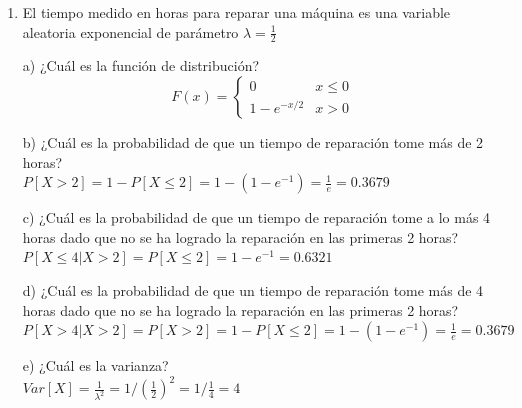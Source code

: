 \documentclass[a4paper, 12pt]{article}
\newcommand{\Aspace}{0.2cm}
\begin{document}
    \begin{enumerate}
        \item El tiempo medido en horas para reparar una máquina es una variable aleatoria exponencial de parámetro $\lambda = \frac{1}{2}$
            \vspace{\Aspace} \par
            a) ¿Cuál es la función de distribución?
            \\ { \color{azul} 
                \[
                    F(x) = 
                    \begin{cases}
                        0               &   x \leq 0 \\
                        1 - e^{-x/2}    &   x > 0
                    \end{cases}
                \]
            }

            \vspace{\Aspace} \par
            b) ¿Cuál es la probabilidad de que un tiempo de reparación tome más de 2 horas?
            \\ { \color{azul} $P[X > 2] = 1 - P[X \leq 2] = 1 - (1 - e^{-1}) = \frac{1}{e} = 0{.}3679$ }

            \vspace{\Aspace} \par
            c) ¿Cuál es la probabilidad de que un tiempo de reparación tome a lo más 4 horas dado que no se ha logrado la reparación en las primeras 2 horas?
            \\ { \color{azul} $P[X \leq 4 | X > 2] = P[X \leq 2] = 1 - e^{-1} = 0{.}6321$ }

            \vspace{\Aspace} \par
            d) ¿Cuál es la probabilidad de que un tiempo de reparación tome más de 4 horas dado que no se ha logrado la reparación en las primeras 2 horas?
            \\ { \color{azul} $P[X > 4 | X > 2] = P[X > 2] = 1 - P[X \leq 2] = 1 - (1 - e^{-1}) = \frac{1}{e} = 0{.}3679$ }

            \vspace{\Aspace} \par
            e) ¿Cuál es la varianza?
            \\ { \color{azul} $Var[X] = \frac{1}{\lambda^{2}} = 1 / (\frac{1}{2})^{2} = 1 / \frac{1}{4} = 4$ }


\end{enumerate}
\end{document}
